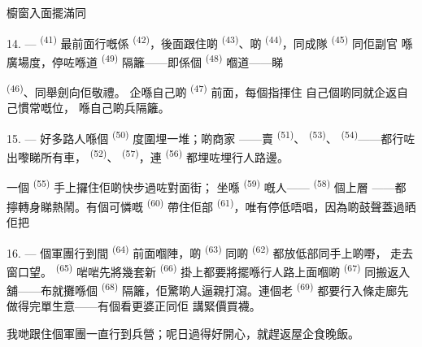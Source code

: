櫥窗入面擺滿同

\VUsaut{3.0mm}

14. ---  \textsuperscript{(41)} 最前面行嘅係
\textsuperscript{(42)}，後面跟住啲 \textsuperscript{(43)}、啲
\textsuperscript{(44)}，同成隊 \textsuperscript{(45)} 同佢副官
喺廣場度，停咗喺道 \textsuperscript{(49)} 隔籬——即係個
\textsuperscript{(48)} 嗰道——睇

 \textsuperscript{(46)}、同舉劍向佢敬禮。
企喺自己啲 \textsuperscript{(47)} 前面，每個指揮住
自己個啲同就企返自己慣常嘅位，
喺自己啲兵隔籬。

15. --- 好多路人喺個 \textsuperscript{(50)} 度圍埋一堆；啲商家
——賣 \textsuperscript{(51)}、 \textsuperscript{(53)}、
\textsuperscript{(54)}——都行咗出嚟睇所有車，
\textsuperscript{(52)}、 \textsuperscript{(57)}，連 \textsuperscript{(56)}
都埋咗埋行人路邊。

\VUsaut{3.0mm}

一個 \textsuperscript{(55)} 手上攞住佢啲快步過咗對面街；
坐喺 \textsuperscript{(59)} 嘅人—— \textsuperscript{(58)} 個上層
——都擰轉身睇熱鬧。有個可憐嘅 \textsuperscript{(60)} 帶住佢部
 \textsuperscript{(61)}，唯有停低唔唱，因為啲鼓聲蓋過晒佢把

16. --- 個軍團行到間 \textsuperscript{(64)} 前面嗰陣，啲
\textsuperscript{(63)} 同啲 \textsuperscript{(62)} 都放低部同手上啲嘢，
走去窗口望。 \textsuperscript{(65)} 啱啱先將幾套新
\textsuperscript{(66)} 掛上都要將擺喺行人路上面嗰啲
\textsuperscript{(67)} 同搬返入舖——布就攤喺個
\textsuperscript{(68)} 隔籬，佢驚啲人逼親打瀉。連個老
\textsuperscript{(69)} 都要行入條走廊先做得完單生意——有個看更婆正同佢
講緊價買襪。

我哋跟住個軍團一直行到兵營；呢日過得好開心，就趕返屋企食晚飯。

